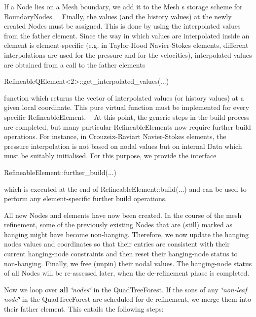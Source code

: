 \begin{DoxyItemize}
 If a {\ttfamily Node} lies on a {\ttfamily Mesh} boundary, we add it to the {\ttfamily Mesh} \textquotesingle{}s storage scheme for {\ttfamily Boundary\+Nodes}. ~\newline
 Finally, the values (and the history values) at the newly created {\ttfamily Nodes} must be assigned. This is done by using the interpolated values from the father element. Since the way in which values are interpolated inside an element is element-\/specific (e.\+g. in Taylor-\/\+Hood Navier-\/\+Stokes elements, different interpolations are used for the pressure and for the velocities), interpolated values are obtained from a call to the father element\textquotesingle{}s 
\begin{DoxyCode}
RefineableQElement<2>::get\_interpolated\_values(...) 
\end{DoxyCode}
 function which returns the vector of interpolated values (or history values) at a given local coordinate. This pure virtual function must be implemented for every specific {\ttfamily Refineable\+Element}. ~\newline
 At this point, the generic steps in the build process are completed, but many particular {\ttfamily Refineable\+Elements} now require further build operations. For instance, in Crouzeix-\/\+Raviart Navier-\/\+Stokes elements, the pressure interpolation is not based on nodal values but on internal {\ttfamily Data} which must be suitably initialised. For this purpose, we provide the interface 
\begin{DoxyCode}
RefineableElement::further\_build(...) 
\end{DoxyCode}
 which is executed at the end of {\ttfamily Refineable\+Element\+::build}(...) and can be used to perform any element-\/specific further build operations.
\item All new {\ttfamily Nodes} and elements have now been created. In the course of the mesh refinement, some of the previously existing {\ttfamily Nodes} that are (still) marked as hanging might have become non-\/hanging. Therefore, we now update the hanging nodes\textquotesingle{} values and coordinates so that their entries are consistent with their current hanging-\/node constraints and then reset their hanging-\/node status to non-\/hanging. Finally, we free (unpin) their nodal values. The hanging-\/node status of all {\ttfamily Nodes} will be re-\/assessed later, when the de-\/refinement phase is completed.
\item Now we loop over {\bfseries all} {\itshape \char`\"{}nodes\char`\"{}} in the {\ttfamily Quad\+Tree\+Forest}. If the sons of any {\itshape \char`\"{}non-\/leaf node\char`\"{}} in the {\ttfamily Quad\+Tree\+Forest} are scheduled for de-\/refinement, we merge them into their father element. This entails the following steps\+:

\end{DoxyItemize}
